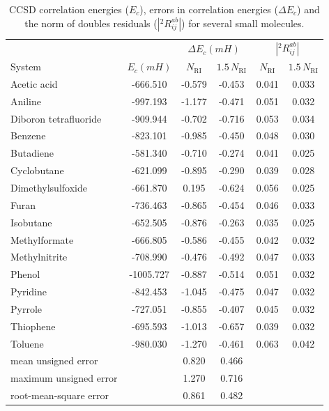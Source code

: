 \begin{center}
\begin{table}[!ht]
\caption{CCSD correlation energies ($E_c$), errors in
correlation energies ($\Delta E_c$) 
and the norm of doubles residuals ($|{}^2R_{ij}^{ab}|$) for several small 
molecules.
\label{tab:energies_thc_rccsd}}
\begin{tabular}{lccccc}
\hline \hline
& & \multicolumn{2}{c}{$\Delta E_c (mH)$} & 
\multicolumn{2}{c}{$|{}^2R_{ij}^{ab}|$}\\
\cline{3-4} \cline{5-6} System & $E_c (mH)$ & $N_\mathrm{RI}$ &
$1.5 \, N_\mathrm{RI}$ & $N_\mathrm{RI}$ &
$1.5 \, N_\mathrm{RI}$\\
\hline
Acetic acid & -666.510 & -0.579 & -0.453 & 0.041 & 0.033 \\
Aniline & -997.193 & -1.177 & -0.471 & 0.051 & 0.032 \\
Diboron tetrafluoride & -909.944 & -0.702 & -0.716 & 0.053 & 0.034\\
Benzene & -823.101 & -0.985 & -0.450 & 0.048 & 0.030\\
Butadiene & -581.340 & -0.710 & -0.274 & 0.041 & 0.025\\
Cyclobutane & -621.099 & -0.895 & -0.290 & 0.039 & 0.028\\
Dimethylsulfoxide & -661.870 & 0.195 & -0.624 & 0.056 & 0.025\\
Furan & -736.463 & -0.865 & -0.454 & 0.046 & 0.033\\
Isobutane & -652.505 & -0.876 & -0.263 & 0.035 & 0.025\\
Methylformate & -666.805 & -0.586 & -0.455 & 0.042 & 0.032\\
Methylnitrite & -708.990 & -0.476 & -0.492 & 0.047 & 0.033\\
Phenol & -1005.727 & -0.887 & -0.514 & 0.051 & 0.032\\
Pyridine & -842.453 & -1.045 & -0.475 & 0.047 & 0.032\\
Pyrrole & -727.051 & -0.855 & -0.407 & 0.045 & 0.032\\
Thiophene & -695.593 & -1.013 & -0.657 & 0.039 & 0.032\\
Toluene & -980.030 & -1.270 & -0.461 & 0.063 & 0.042\\
\hline
mean unsigned error & & 0.820 & 0.466 & &\\
maximum unsigned error & & 1.270 & 0.716 & &\\
root-mean-square error & & 0.861 & 0.482 & &\\
\hline\hline
\end{tabular}
\end{table}

\end{center}
